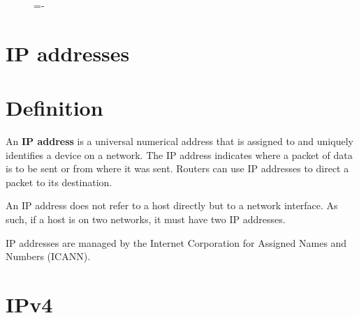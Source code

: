 \documentclass[a4paper]{systems-software}
\begin{document}
\begin{figure}[H]
	\lineskip=-\fboxrule
\end{figure}


\newpage

\section{IP addresses}

\section*{Definition}

An \textbf{IP address} is a universal numerical address that is assigned to and uniquely identifies a device on a network. The IP address indicates where a packet of data is to be sent or from where it was sent. Routers can use IP addresses to direct a packet to its destination.

An IP address does not refer to a host directly but to a network interface. As such, if a host is on two networks, it must have two IP addresses.

IP addresses are managed by the Internet Corporation for Assigned Names and Numbers (ICANN).


\section*{IPv4}
\end{document}
